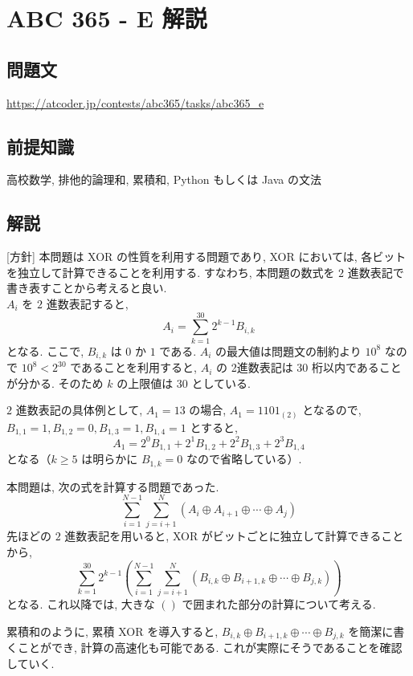 \chapter*{ABC 365 - E 解説}
    \section*{問題文}
    \url{https://atcoder.jp/contests/abc365/tasks/abc365_e}

    \section*{前提知識}
    高校数学, 排他的論理和, 累積和, Python もしくは Java の文法

    \section*{解説}
    [方針] 本問題は XOR の性質を利用する問題であり, XOR においては, 各ビットを独立して計算できることを利用する.
    すなわち, 本問題の数式を $2$ 進数表記で書き表すことから考えると良い.\\

    $A_i$ を $2$ 進数表記すると,
    $$ A_i = \sum_{k=1}^{30} 2^{k - 1} B_{i, k} $$
    となる.
    ここで, $B_{i, k}$ は $0$ か $1$ である.
    $A_i$ の最大値は問題文の制約より $10^8$ なので $10^8 < 2^{30}$ であることを利用すると, $A_i$ の 2進数表記は $30$ 桁以内であることが分かる.
    そのため $k$ の上限値は $30$ としている.

    $2$ 進数表記の具体例として, $A_1 = 13$ の場合, $A_1 = 1101_{(2)}$ となるので, $B_{1, 1} = 1, B_{1, 2} = 0, B_{1, 3} = 1, B_{1, 4} = 1$ とすると,
    $$A_1 = 2^0 B_{1, 1} + 2^1 B_{1, 2} + 2^2 B_{1, 3} + 2^3 B_{1, 4}$$
    となる（$k \ge 5$ は明らかに $B_{1, k} = 0$ なので省略している）.

    本問題は, 次の式を計算する問題であった.
    $$\sum_{i = 1}^{N - 1}\sum_{j = i + 1}^N (A_i \oplus A_{i + 1} \oplus \cdots \oplus A_j)$$
    先ほどの $2$ 進数表記を用いると, XOR がビットごとに独立して計算できることから,
    $$\sum_{k = 1}^{30} 2^{k - 1} \left(\sum_{i = 1}^{N - 1}\sum_{j = i + 1}^N (B_{i, k} \oplus B_{i + 1, k} \oplus \cdots \oplus B_{j, k})\right)$$
    となる.
    これ以降では, 大きな $\left(\right)$ で囲まれた部分の計算について考える.

    累積和のように, 累積 XOR を導入すると, $B_{i, k} \oplus B_{i + 1, k} \oplus \cdots \oplus B_{j, k}$ を簡潔に書くことができ, 計算の高速化も可能である.
    これが実際にそうであることを確認していく.

